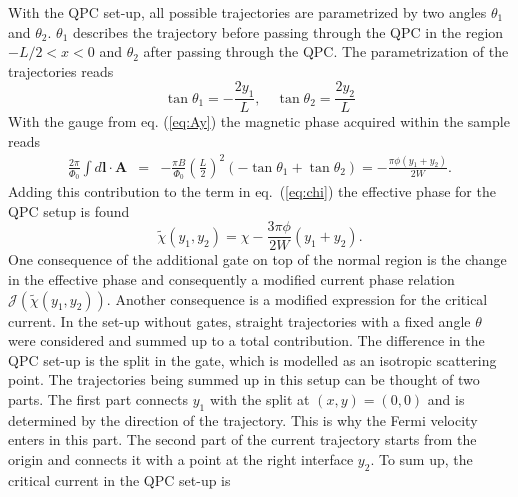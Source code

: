 With the QPC set-up, all possible trajectories are parametrized by two angles $\theta_1$ and $\theta_2$. $\theta_1$ describes the trajectory before passing through the QPC in the region $ -L/2 < x < 0$ and  $\theta_2$ after passing through the QPC. The parametrization of the trajectories reads
\begin{equation}
\tan \theta_1 = - \frac{2 y_1}{L}, \quad \tan \theta_2 = \frac{2 y_2}{L}
\label{eq:QPCparametrization}
\end{equation}
With the gauge from eq. (\ref{eq:Ay}) the magnetic phase acquired within the sample reads
\begin{eqnarray}
\frac{2\pi}{\Phi_0} \int d\mathbf{l} \cdot \mathbf{A}  &=&
-\frac{\pi B}{\Phi_0}\left(\frac{L}{2}\right)^2
\left(-\tan\theta_1 + \tan\theta_2\right) =
-\frac{\pi \phi (y_1+y_2)}{2 W}.
\label{eq:phaseQPC}
\end{eqnarray}
Adding this contribution to the term in eq.~(\ref{eq:chi}) the effective phase for the QPC setup is found
\begin{equation}
\tilde{\chi}(y_1,y_2)=\chi-\frac{3 \pi \phi }{2W}(y_1+y_2).
\label{eq:chiQPC}
\end{equation}
One consequence of the additional gate on top of the normal region is the change in the effective phase and consequently a modified current phase relation $\mathcal{J}(\tilde{\chi}(y_1, y_2))$. Another consequence is a modified expression for the critical current. In the set-up without gates, straight trajectories with a fixed angle $\theta$ were considered and summed up to a total contribution. The difference in the QPC set-up is the split in the gate, which is modelled as an isotropic scattering point. The trajectories being summed up in this setup can be thought of two parts. The first part connects $y_1$ with the split at $(x, y) = (0, 0)$ and is determined by the direction of the trajectory. This is why the Fermi velocity enters in this part. The second part of the current trajectory starts from the origin and connects it with a point at the right interface $y_2$. To sum up, the  critical current in the QPC set-up is
